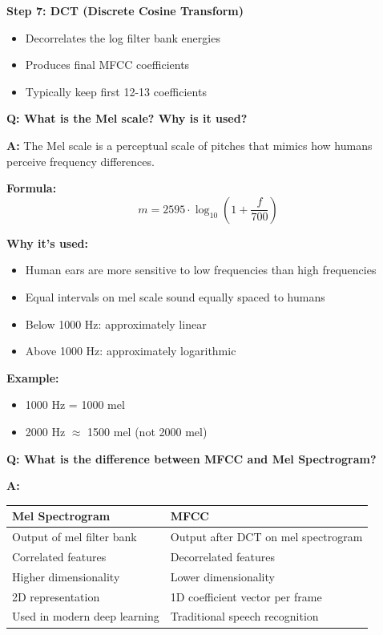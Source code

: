 \documentclass[a4paper,12pt]{article}
\newcommand{\vivaQ}[1]{\textcolor{questioncolor}{\textbf{Q: #1}}}
\newcommand{\vivaA}[1]{\textcolor{answercolor}{\textbf{A:}} #1}
\begin{document}
{\textbf{Step 7: DCT (Discrete Cosine Transform)}
\begin{itemize}
    \item Decorrelates the log filter bank energies
    \item Produces final MFCC coefficients
    \item Typically keep first 12-13 coefficients
\end{itemize}}

\vspace{0.5cm}

\vivaQ{What is the Mel scale? Why is it used?}

\vivaA{The Mel scale is a perceptual scale of pitches that mimics how humans perceive frequency differences.

\textbf{Formula:}
\[m = 2595 \cdot \log_{10}\left(1 + \frac{f}{700}\right)\]

\textbf{Why it's used:}
\begin{itemize}
    \item Human ears are more sensitive to low frequencies than high frequencies
    \item Equal intervals on mel scale sound equally spaced to humans
    \item Below 1000 Hz: approximately linear
    \item Above 1000 Hz: approximately logarithmic
\end{itemize}

\textbf{Example:}
\begin{itemize}
    \item 1000 Hz = 1000 mel
    \item 2000 Hz $\approx$ 1500 mel (not 2000 mel)
\end{itemize}}

\vspace{0.5cm}

\vivaQ{What is the difference between MFCC and Mel Spectrogram?}

\vivaA{
\begin{tabular}{|l|l|}
\hline
\textbf{Mel Spectrogram} & \textbf{MFCC} \\
\hline
Output of mel filter bank & Output after DCT on mel spectrogram \\
\hline
Correlated features & Decorrelated features \\
\hline
Higher dimensionality & Lower dimensionality \\
\hline
2D representation & 1D coefficient vector per frame \\
\hline
Used in modern deep learning & Traditional speech recognition \\
\hline
\end{tabular}}
\end{document}
